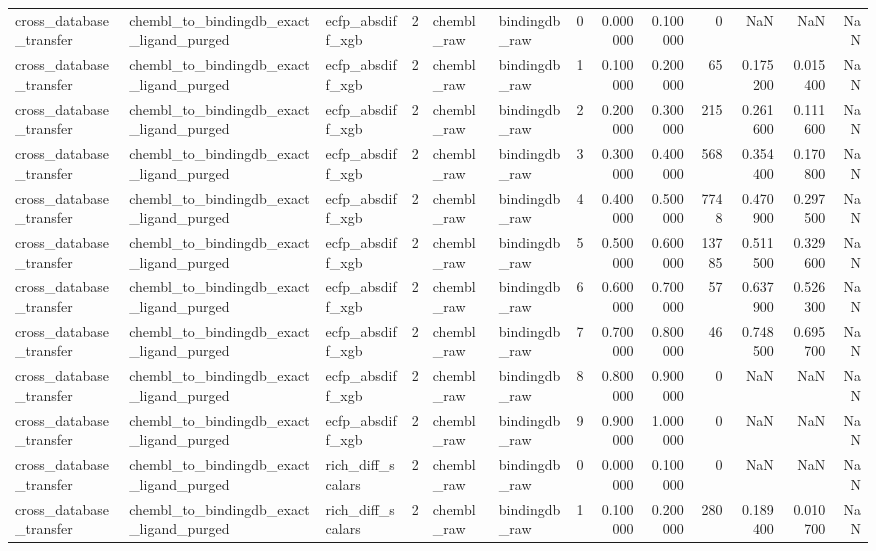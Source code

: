 \begin{longtable}{lllrllrrrrrrr}
cross\_database\_transfer & chembl\_to\_bindingdb\_exact\_ligand\_purged & ecfp\_absdiff\_xgb & 2 & chembl\_raw & bindingdb\_raw & 0 & 0.000000 & 0.100000 & 0 & NaN & NaN & NaN \\
cross\_database\_transfer & chembl\_to\_bindingdb\_exact\_ligand\_purged & ecfp\_absdiff\_xgb & 2 & chembl\_raw & bindingdb\_raw & 1 & 0.100000 & 0.200000 & 65 & 0.175200 & 0.015400 & NaN \\
cross\_database\_transfer & chembl\_to\_bindingdb\_exact\_ligand\_purged & ecfp\_absdiff\_xgb & 2 & chembl\_raw & bindingdb\_raw & 2 & 0.200000 & 0.300000 & 215 & 0.261600 & 0.111600 & NaN \\
cross\_database\_transfer & chembl\_to\_bindingdb\_exact\_ligand\_purged & ecfp\_absdiff\_xgb & 2 & chembl\_raw & bindingdb\_raw & 3 & 0.300000 & 0.400000 & 568 & 0.354400 & 0.170800 & NaN \\
cross\_database\_transfer & chembl\_to\_bindingdb\_exact\_ligand\_purged & ecfp\_absdiff\_xgb & 2 & chembl\_raw & bindingdb\_raw & 4 & 0.400000 & 0.500000 & 7748 & 0.470900 & 0.297500 & NaN \\
cross\_database\_transfer & chembl\_to\_bindingdb\_exact\_ligand\_purged & ecfp\_absdiff\_xgb & 2 & chembl\_raw & bindingdb\_raw & 5 & 0.500000 & 0.600000 & 13785 & 0.511500 & 0.329600 & NaN \\
cross\_database\_transfer & chembl\_to\_bindingdb\_exact\_ligand\_purged & ecfp\_absdiff\_xgb & 2 & chembl\_raw & bindingdb\_raw & 6 & 0.600000 & 0.700000 & 57 & 0.637900 & 0.526300 & NaN \\
cross\_database\_transfer & chembl\_to\_bindingdb\_exact\_ligand\_purged & ecfp\_absdiff\_xgb & 2 & chembl\_raw & bindingdb\_raw & 7 & 0.700000 & 0.800000 & 46 & 0.748500 & 0.695700 & NaN \\
cross\_database\_transfer & chembl\_to\_bindingdb\_exact\_ligand\_purged & ecfp\_absdiff\_xgb & 2 & chembl\_raw & bindingdb\_raw & 8 & 0.800000 & 0.900000 & 0 & NaN & NaN & NaN \\
cross\_database\_transfer & chembl\_to\_bindingdb\_exact\_ligand\_purged & ecfp\_absdiff\_xgb & 2 & chembl\_raw & bindingdb\_raw & 9 & 0.900000 & 1.000000 & 0 & NaN & NaN & NaN \\
cross\_database\_transfer & chembl\_to\_bindingdb\_exact\_ligand\_purged & rich\_diff\_scalars & 2 & chembl\_raw & bindingdb\_raw & 0 & 0.000000 & 0.100000 & 0 & NaN & NaN & NaN \\
cross\_database\_transfer & chembl\_to\_bindingdb\_exact\_ligand\_purged & rich\_diff\_scalars & 2 & chembl\_raw & bindingdb\_raw & 1 & 0.100000 & 0.200000 & 280 & 0.189400 & 0.010700 & NaN \\

\end{longtable}
